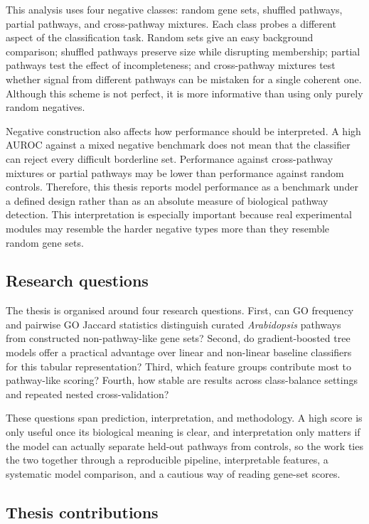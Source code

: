 \documentclass[12pt,twoside]{article}
\begin{document}
This analysis uses four negative classes: random gene sets, shuffled pathways, partial pathways, and cross-pathway mixtures. Each class probes a different aspect of the classification task. Random sets give an easy background comparison; shuffled pathways preserve size while disrupting membership; partial pathways test the effect of incompleteness; and cross-pathway mixtures test whether signal from different pathways can be mistaken for a single coherent one. Although this scheme is not perfect, it is more informative than using only purely random negatives.

Negative construction also affects how performance should be interpreted. A high AUROC against a mixed negative benchmark does not mean that the classifier can reject every difficult borderline set. Performance against cross-pathway mixtures or partial pathways may be lower than performance against random controls. Therefore, this thesis reports model performance as a benchmark under a defined design rather than as an absolute measure of biological pathway detection. This interpretation is especially important because real experimental modules may resemble the harder negative types more than they resemble random gene sets.

\subsection{Research questions}
\label{sec:bg_research_questions}

The thesis is organised around four research questions. First, can GO frequency and pairwise GO Jaccard statistics distinguish curated \textit{Arabidopsis} pathways from constructed non-pathway-like gene sets? Second, do gradient-boosted tree models offer a practical advantage over linear and non-linear baseline classifiers for this tabular representation? Third, which feature groups contribute most to pathway-like scoring? Fourth, how stable are results across class-balance settings and repeated nested cross-validation?

These questions span prediction, interpretation, and methodology. A high score is only useful once its biological meaning is clear, and interpretation only matters if the model can actually separate held-out pathways from controls, so the work ties the two together through a reproducible pipeline, interpretable features, a systematic model comparison, and a cautious way of reading gene-set scores.

\subsection{Thesis contributions}
\label{sec:bg_contributions}
\end{document}
